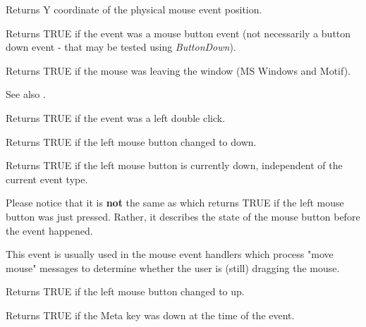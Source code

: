 
Returns Y coordinate of the physical mouse event position.



Returns TRUE if the event was a mouse button event (not necessarily a button down event -
that may be tested using {\it ButtonDown}).

\label{wxmouseeventleaving}


Returns TRUE if the mouse was leaving the window (MS Windows and Motif).

See also .



Returns TRUE if the event was a left double click.

\label{wxmouseeventleftdown}


Returns TRUE if the left mouse button changed to down.



Returns TRUE if the left mouse button is currently down, independent
of the current event type.

Please notice that it is {\bf not} the same as 
 which returns TRUE if the left mouse
button was just pressed. Rather, it describes the state of the mouse button
before the event happened.

This event is usually used in the mouse event handlers which process "move
mouse" messages to determine whether the user is (still) dragging the mouse.



Returns TRUE if the left mouse button changed to up.



Returns TRUE if the Meta key was down at the time of the event.

